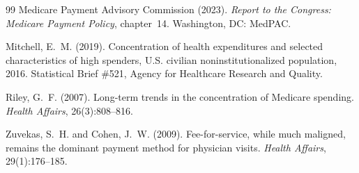 \documentclass[12pt,letterpaper]{article}
\begin{document}
\begin{thebibliography}{99}
Medicare Payment Advisory Commission (2023).
\newblock \textit{Report to the Congress: Medicare Payment Policy}, chapter~14.
\newblock Washington, DC: MedPAC.

Mitchell, E.~M. (2019).
\newblock Concentration of health expenditures and selected characteristics of
  high spenders, U.S. civilian noninstitutionalized population, 2016.
\newblock Statistical Brief \#521, Agency for Healthcare Research and Quality.

Riley, G.~F. (2007).
\newblock Long-term trends in the concentration of Medicare spending.
\newblock \textit{Health Affairs}, 26(3):808--816.

Zuvekas, S.~H. and Cohen, J.~W. (2009).
\newblock Fee-for-service, while much maligned, remains the dominant payment
  method for physician visits.
\newblock \textit{Health Affairs}, 29(1):176--185.

\end{thebibliography}
\end{document}
